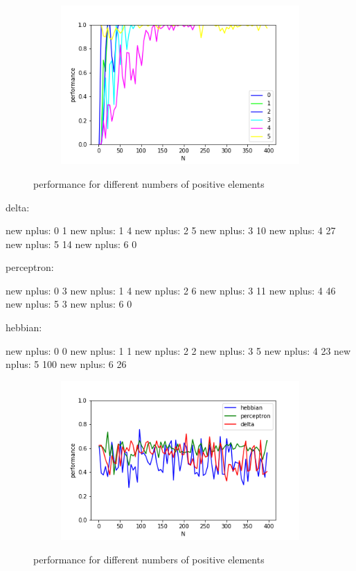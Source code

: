 \documentclass{article}
\begin{document}
\begin{figure}[h]
\begin{subfigure}[t]{0.32\linewidth}
		\includegraphics[width = 1.0\linewidth, trim={0 0 0 0}, clip=true]{figures/nplus_delta.png}
	\end{subfigure}%
\caption{performance for different numbers of positive elements}
\label{fig:nplus}
\end{figure}

delta:

new nplus: 0
1
new nplus: 1
4
new nplus: 2
5
new nplus: 3
10
new nplus: 4
27
new nplus: 5
14
new nplus: 6
0


perceptron:

new nplus: 0
3
new nplus: 1
4
new nplus: 2
6
new nplus: 3
11
new nplus: 4
46
new nplus: 5
3
new nplus: 6
0


hebbian:

new nplus: 0
0
new nplus: 1
1
new nplus: 2
2
new nplus: 3
5
new nplus: 4
23
new nplus: 5
100
new nplus: 6
26

\begin{figure}[h]
	\centering
	\begin{subfigure}[t]{0.62\linewidth}
		\centering
		\includegraphics[width = 1.0\linewidth, trim={0 0 0 0}, clip=true]{figures/compare_prod.png}
	\end{subfigure}%
\caption{performance for different numbers of positive elements}
\label{fig:nplus}
\end{figure}
\end{document}
